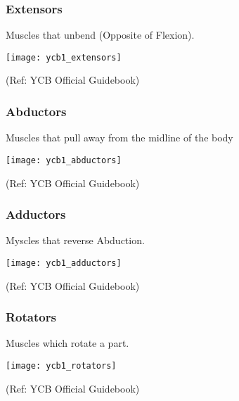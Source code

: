 \begin{frame}[fragile]\frametitle{Extensors}

 Muscles  that  unbend  (Opposite 
of Flexion).

		\begin{center}
		\texttt{[image: ycb1\_extensors]}
				
		\end{center}	

  
		{\tiny (Ref: YCB Official Guidebook)}		
  
\end{frame}

\begin{frame}[fragile]\frametitle{Abductors}

Muscles that pull away from the 
midline of the body

		\begin{center}
		\texttt{[image: ycb1\_abductors]}
				
		\end{center}	

  
		{\tiny (Ref: YCB Official Guidebook)}		
  
\end{frame}

\begin{frame}[fragile]\frametitle{Adductors}

 Myscles that reverse Abduction.

		\begin{center}
		\texttt{[image: ycb1\_adductors]}
				
		\end{center}	

  
		{\tiny (Ref: YCB Official Guidebook)}		
  
\end{frame}


\begin{frame}[fragile]\frametitle{Rotators}

Muscles which rotate a part.

		\begin{center}
		\texttt{[image: ycb1\_rotators]}
				
		\end{center}	

  
		{\tiny (Ref: YCB Official Guidebook)}		
  
\end{frame}



